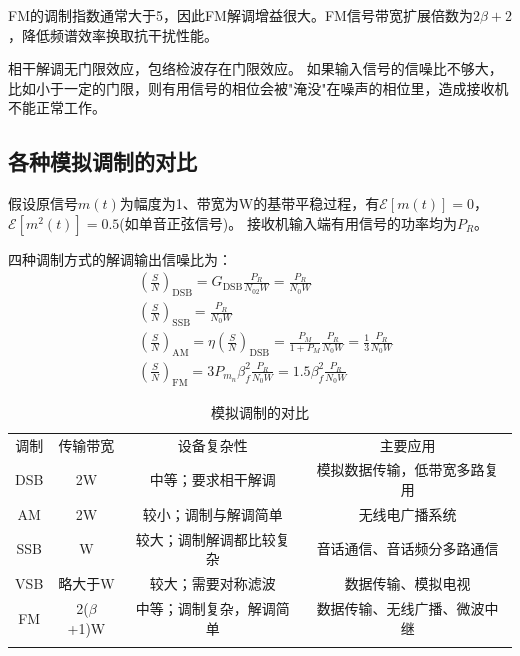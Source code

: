     FM的调制指数通常大于5，因此FM解调增益很大。FM信号带宽扩展倍数为$2\beta+2$，降低频谱效率换取抗干扰性能。

    相干解调无门限效应，包络检波存在门限效应。
    如果输入信号的信噪比不够大，比如小于一定的门限，则有用信号的相位会被"淹没"在噪声的相位里，造成接收机不能正常工作。

    
\subsection{各种模拟调制的对比}
    假设原信号$m(t)$为幅度为1、带宽为W的基带平稳过程，有$\mathscr{E}[m(t)]=0$，$\mathscr{E}[m^2(t)]=0.5$(如单音正弦信号)。
    接收机输入端有用信号的功率均为$P_R$。

    四种调制方式的解调输出信噪比为：
    \begin{align}
        &\left(\frac{S}{N}\right)_{\text{DSB}}=G_{\text{DSB}}\frac{P_R}{N_02W}=\frac{P_R}{N_0W}\\
        &\left(\frac{S}{N}\right)_{\text{SSB}}=\frac{P_R}{N_0W}\\
        &\left(\frac{S}{N}\right)_{\text{AM}}=\eta\left(\frac{S}{N}\right)_{\text{DSB}}=\frac{P_M}{1+P_M}\frac{P_R}{N_0W}=\frac{1}{3}\frac{P_R}{N_0W}\\
        &\left(\frac{S}{N}\right)_{\text{FM}}=3P_{m_n}\beta_f^2\frac{P_R}{N_0W}=1.5\beta_f^2\frac{P_R}{N_0W}
    \end{align}
    \begin{table}[H]
        \centering
        \caption{模拟调制的对比}
        \begin{tabular}{c|c|c|c}
            \Xhline{1pt}
            \textcolor{bupt}{调制}    & \textcolor{bupt}{传输带宽} & \textcolor{bupt}{设备复杂性}              & \textcolor{bupt}{主要应用}                    \\ \Xhline{0.5pt}
            \textcolor{bupt}{DSB}     &   2W                      & \parbox[t]{12em}{中等；要求相干解调}       & \parbox[t]{14em}{模拟数据传输，低带宽多路复用}  \\ \Xhline{0.5pt}
            \textcolor{bupt}{AM}      &   2W                      & \parbox[t]{12em}{较小；调制与解调简单}     & \parbox[t]{14em}{无线电广播系统}               \\ \Xhline{0.5pt}
            \textcolor{bupt}{SSB}     &   W                       & \parbox[t]{12em}{较大；调制解调都比较复杂} & \parbox[t]{14em}{音话通信、音话频分多路通信}     \\ \Xhline{0.5pt}
            \textcolor{bupt}{VSB}     &   略大于W                 & \parbox[t]{12em}{较大；需要对称滤波}       & \parbox[t]{14em}{数据传输、模拟电视}            \\ \Xhline{0.5pt}
            \textcolor{bupt}{FM}      &   2($\beta$+1)W           & \parbox[t]{12em}{中等；调制复杂，解调简单} & \parbox[t]{14em}{数据传输、无线广播、微波中继}   \\ \Xhline{1pt}
        \end{tabular}
    \end{table}